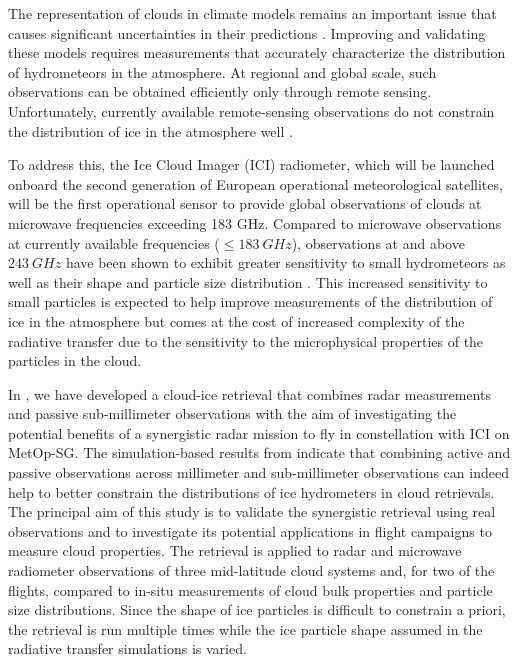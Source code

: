 \documentclass[journal abbreviation, manuscript]{copernicus}
\begin{document}
\introduction  %

The representation of clouds in climate models remains an important issue that
causes significant uncertainties in their predictions \citep{zelinka20}.
Improving and validating these models requires measurements that accurately
characterize the distribution of hydrometeors in the atmosphere. At regional and
global scale, such observations can be obtained efficiently only through remote
sensing. Unfortunately, currently available remote-sensing observations do not
constrain the distribution of ice in the atmosphere well \citep{waliser09,
  eliasson11, duncan18a}.

To address this, the Ice Cloud Imager (ICI) radiometer, which will be launched
onboard the second generation of European operational meteorological satellites,
will be the first operational sensor to provide global observations of clouds at
microwave frequencies exceeding 183 GHz. Compared to microwave observations at
currently available frequencies ($\leq 183\ \unit{GHz}$), observations at and
above $243\ \unit{GHz}$ have been shown to exhibit greater sensitivity to small
hydrometeors \citep{buehler12} as well as their shape and particle size
distribution \citep{evans98}. This increased sensitivity to small particles is
expected to help improve measurements of the distribution of ice in the
atmosphere but comes at the cost of increased complexity of the radiative
transfer due to the sensitivity to the microphysical properties of the particles
in the cloud.

In \citet{pfreundschuh19}, we have developed a cloud-ice retrieval that combines
radar measurements and passive sub-millimeter observations with the aim of
investigating the potential benefits of a synergistic radar mission to fly in
constellation with ICI on MetOp-SG. The simulation-based results from
\citet{pfreundschuh19} indicate that combining active and passive observations
across millimeter and sub-millimeter observations can indeed help to better
constrain the distributions of ice hydrometers in cloud retrievals. The
principal aim of this study is to validate the synergistic retrieval using real
observations and to investigate its potential applications in flight campaigns
to measure cloud properties. The retrieval is applied to radar and microwave
radiometer observations of three mid-latitude cloud systems and, for two of the
flights, compared to in-situ measurements of cloud bulk properties and particle
size distributions. Since the shape of ice particles is difficult to constrain a
priori, the retrieval is run multiple times while the ice particle shape assumed
in the radiative transfer simulations is varied.
\end{document}
